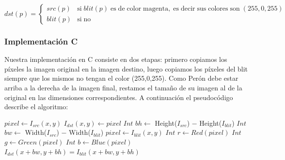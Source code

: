 $dst(p) = \begin{cases}
    src(p) & \mathrm{si \;} blit(p) \mathrm{\; es \; de \; color \; magenta, \; es \; decir \; sus \; colores \; son \;} (255, 0, 255)\\
    blit(p) & \mathrm{si \; no}
\end{cases}$ \\

\subsubsection{Implementación C}



Nuestra implementación en C consiste en dos etapas: primero copiamos los píxeles la imagen original en la imagen destino, luego copiamos los píxeles del blit siempre que los mismos no tengan el color (255,0,255). Como Perón debe estar arriba a la derecha de la imagen final, restamos el tamaño de su imagen al de la original en las dimensiones correspondientes. A continuación el pseudocódigo describe el algoritmo:

\begin{algorithm}[H]
  \begin{algorithmic}[1]
			  \STATE $pixel \gets I_{src}(x,y)$ 
			  \STATE $I_{dst}(x,y) \gets pixel$
			\ENDFOR
		\ENDFOR
		\STATE $Int$ $ bh \gets $ Height($I_{src}$) $-$ Height($I_{blit}$)
		\STATE $Int$ $ bw \gets $ Width($I_{src}$) $-$ Width($I_{blit}$)
			  	\STATE $pixel \gets I_{blit}(x,y)$
				\STATE $Int$ $ r \gets Red(pixel) $
			  	\STATE $Int$ $g \gets Green(pixel)$
			  	\STATE $Int$ $ b \gets Blue(pixel)$
					\STATE $I_{dst}(x+bw,y+bh) = I_{blit}(x+bw,y+bh)$ 
				\ENDIF
			\ENDFOR
		 \ENDFOR
  \end{algorithmic}
  \caption{$blit (I_{src}, I_{dst}, I_{blit})$}
  \label{alg:blit}
\end{algorithm}


